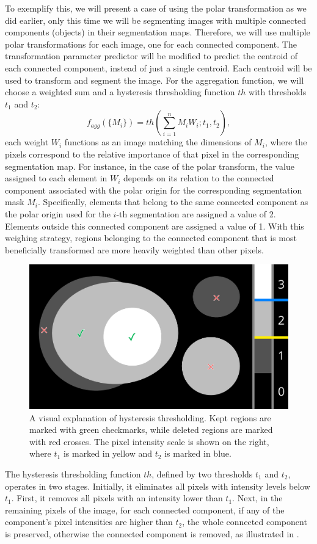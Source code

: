 To exemplify this, we will present a case of using the polar transformation as we did earlier, only this time we will be segmenting images with multiple connected components (objects) in their segmentation maps. Therefore, we will use multiple polar transformations for each image, one for each connected component. The transformation parameter predictor will be modified to predict the centroid of each connected component, instead of just a single centroid. Each centroid will be used to transform and segment the image. For the aggregation function, we will choose a weighted sum and a hysteresis thresholding function $th$ with thresholds $t_1$ and $t_2$:
\begin{equation}
	f_{agg}(\{M_i\}) = th(\sum_{i = 1}^n M_i W_i; t_1, t_2),
\end{equation}
each weight \(W_i\) functions as an image matching the dimensions of \(M_i\), where the pixels correspond to the relative importance of that pixel in the corresponding segmentation map. For instance, in the case of the polar transform, the value assigned to each element in \(W_i\) depends on its relation to the connected component associated with the polar origin for the corresponding segmentation mask \(M_i\). Specifically, elements that belong to the same connected component as the polar origin used for the \(i\)-th segmentation are assigned a value of 2. Elements outside this connected component are assigned a value of 1. With this weighing strategy, regions belonging to the connected component that is most beneficially transformed are more heavily weighted than other pixels.

		\begin{figure}[b!]
		\centering
		\includegraphics[width=0.5\linewidth]{images/4/hysteresis-ccs}
		\caption{A visual explanation of hysteresis thresholding. Kept regions are marked with green checkmarks, while deleted regions are marked with red crosses. The pixel intensity scale is shown on the right, where $t_1$ is marked in yellow and $t_2$ is marked in blue.}
		\label{fig:hysteresis-ccs}
	\end{figure}

The hysteresis thresholding function \(th\), defined by two thresholds \(t_1\) and \(t_2\), operates in two stages. Initially, it eliminates all pixels with intensity levels below \(t_1\). First, it removes all pixels with an intensity lower than $t_1$. Next, in the remaining pixels of the image, for each connected component, if any of the component's pixel intensities are higher than $t_2$, the whole connected component is preserved, otherwise the connected component is removed, as illustrated in .
	
